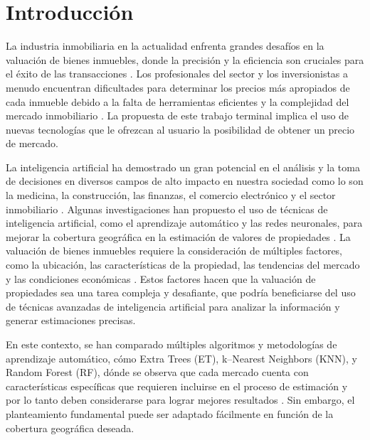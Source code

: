 
\chapter{\textcolor{azulescom}{Introducción}}

La industria inmobiliaria en la actualidad enfrenta grandes desafíos en la
valuación de bienes inmuebles, donde la precisión y la eficiencia son cruciales
para el éxito de las transacciones \cite{pagourtzi2003}. Los profesionales
del sector y los inversionistas a menudo encuentran dificultades para determinar
los precios más apropiados de cada inmueble debido a la falta de herramientas
eficientes y la complejidad del mercado inmobiliario \cite{nedovic2000}.
La propuesta de este trabajo terminal implica el uso de nuevas tecnologías que
le ofrezcan al usuario la posibilidad de obtener un precio de mercado.

La inteligencia artificial ha demostrado un gran potencial en el análisis y la
toma de decisiones en diversos campos de alto impacto en nuestra sociedad como
lo son la medicina, la construcción, las finanzas, el comercio electrónico y el
sector inmobiliario \cite{pagourtzi2003}. Algunas investigaciones han
propuesto el uso de técnicas de inteligencia artificial, como el aprendizaje
automático y las redes neuronales, para mejorar la cobertura geográfica en la
estimación de valores de propiedades \cite{worzala1995,limsombunchai2004}.
La valuación de bienes inmuebles requiere la consideración de múltiples factores,
como la ubicación, las características de la propiedad, las tendencias del mercado
y las condiciones económicas \cite{limsombunchai2004}. Estos factores hacen que la
valuación de propiedades sea una tarea compleja y desafiante, que podría beneficiarse
del uso de técnicas avanzadas de inteligencia artificial para analizar la información
y generar estimaciones precisas.

En este contexto, se han comparado múltiples algoritmos y metodologías de
aprendizaje automático, cómo Extra Trees (ET), k–Nearest Neighbors (KNN), y
Random Forest (RF), dónde se observa que cada mercado cuenta con características
específicas que requieren incluirse en el proceso de estimación y por lo tanto
deben considerarse para lograr mejores resultados \cite{choy2023}.
Sin embargo, el planteamiento fundamental puede ser adaptado fácilmente en función
de la cobertura geográfica deseada.

